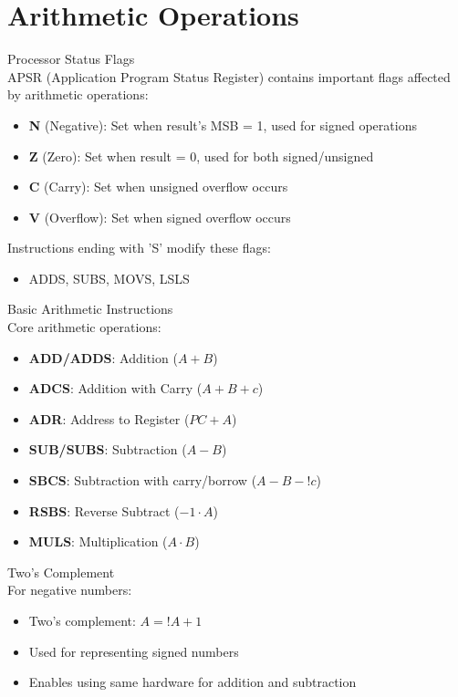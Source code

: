 \section{Arithmetic Operations}

\begin{concept}{Processor Status Flags}\\
APSR (Application Program Status Register) contains important flags affected by arithmetic operations:
\begin{itemize}
  \item \textbf{N} (Negative): Set when result's MSB = 1, used for signed operations
  \item \textbf{Z} (Zero): Set when result = 0, used for both signed/unsigned
  \item \textbf{C} (Carry): Set when unsigned overflow occurs
  \item \textbf{V} (Overflow): Set when signed overflow occurs
\end{itemize}

Instructions ending with 'S' modify these flags:
\begin{itemize}
  \item ADDS, SUBS, MOVS, LSLS
\end{itemize}
\end{concept}

\begin{definition}{Basic Arithmetic Instructions}\\
Core arithmetic operations:
\begin{itemize}
  \item \textbf{ADD/ADDS}: Addition ($A + B$)
  \item \textbf{ADCS}: Addition with Carry ($A + B + c$)
  \item \textbf{ADR}: Address to Register ($PC + A$)
  \item \textbf{SUB/SUBS}: Subtraction ($A - B$)
  \item \textbf{SBCS}: Subtraction with carry/borrow ($A - B - !c$)
  \item \textbf{RSBS}: Reverse Subtract ($-1 \cdot A$)
  \item \textbf{MULS}: Multiplication ($A \cdot B$)
\end{itemize}
\end{definition}

\begin{definition}{Two's Complement}\\
For negative numbers:
\begin{itemize}
  \item Two's complement: $A = !A + 1$
  \item Used for representing signed numbers
  \item Enables using same hardware for addition and subtraction
\end{itemize}
\end{definition}

